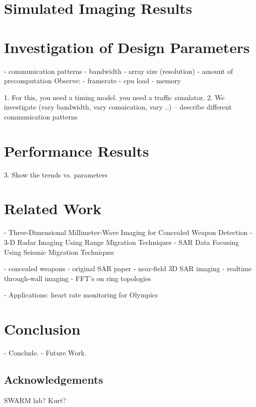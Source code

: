 \section{Simulated Imaging Results}

\section{Investigation of Design Parameters}
- communication patterns
- bandwidth
- array size (resolution)
- amount of precomputation
Observe:
- framerate
- cpu load
- memory

1. For this, you need a timing model. you need a traffic simulator.
2. We investigate (vary bandwidth, vary comuication, vary ..)
-- describe different communication patterns

\section{Performance Results}
3. Show the trends vs. parameters

\section{Related Work}
- Three-Dimensional Millimeter-Wave Imaging for Concealed Weapon Detection
- 3-D Radar Imaging Using Range Migration Techniques
- SAR Data Focusing Using Seismic Migration Techniques

- concealed weapons
- original SAR paper
- near-field 3D SAR imaging
- realtime through-wall imaging
- FFT's on ring topologies

- Applications: heart rate monitoring for Olympics

\section{Conclusion}
- Conclude.
- Future Work.

\subsection*{Acknowledgements}
SWARM lab?
Kurt?


{\small


}


